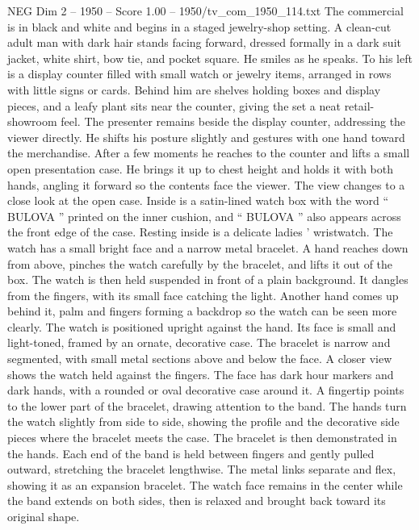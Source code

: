 \begin{textsample}{NEG Dim 2 – 1950 – Score 1.00 – 1950/tv\_com\_1950\_114.txt}  \label{ex:f2_neg_005}
The commercial is in black and white and begins in a staged jewelry-shop setting.
A clean-cut adult man with dark hair stands facing forward, dressed formally in a dark suit jacket, white shirt, bow tie, and pocket square.
He smiles as he speaks.
To his left is a display counter filled with small watch or jewelry items, arranged in rows with little signs or cards.
Behind him are shelves holding boxes and display pieces, and a leafy plant sits near the counter, giving the set a neat retail-showroom feel.
The presenter remains beside the display counter, addressing the viewer directly.
He shifts his posture slightly and gestures with one hand toward the merchandise.
After a few moments he reaches to the counter and lifts a small open presentation case.
He brings it up to chest height and holds it with both hands, angling it forward so the contents face the viewer.
The view changes to a close look at the open case.
Inside is a satin-lined watch box with the word “ BULOVA ” printed on the inner cushion, and “ BULOVA ” also appears across the front edge of the case.
Resting inside is a delicate ladies ’ wristwatch.
The watch has a small bright face and a narrow metal bracelet.
A hand reaches down from above, pinches the watch carefully by the bracelet, and lifts it out of the box.
The watch is then held suspended in front of a plain background.
It dangles from the fingers, with its small face catching the light.
Another hand comes up behind it, palm and fingers forming a backdrop so the watch can be seen more clearly.
The watch is positioned upright against the hand.
Its face is small and light-toned, framed by an ornate, decorative case.
The bracelet is narrow and segmented, with small metal sections above and below the face.
A closer view shows the watch held against the fingers.
The face has dark hour markers and dark hands, with a rounded or oval decorative case around it.
A fingertip points to the lower part of the bracelet, drawing attention to the band.
The hands turn the watch slightly from side to side, showing the profile and the decorative side pieces where the bracelet meets the case.
The bracelet is then demonstrated in the hands.
Each end of the band is held between fingers and gently pulled outward, stretching the bracelet lengthwise.
The metal links separate and flex, showing it as an expansion bracelet.
The watch face remains in the center while the band extends on both sides, then is relaxed and brought back toward its original shape.

\end{textsample}
